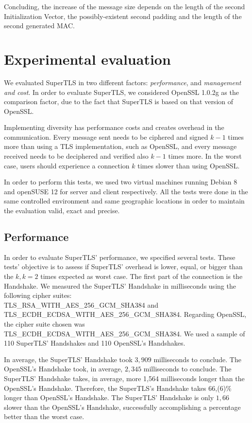 \documentclass{sig-alternate-05-2015}
\begin{document}
Concluding, the increase of the message size depends on the length of the second Initialization Vector, the possibly-existent second padding and the length of the second generated MAC.

\section{Experimental evaluation}

We evaluated SuperTLS in two different factors: \textit{performance}, and \textit{management and cost}.
In order to evaluate SuperTLS, we considered OpenSSL 1.0.2g as the comparison factor, due to the fact that SuperTLS is based on that version of OpenSSL.

Implementing diversity has performance costs and creates overhead in the communication. Every message sent needs to be ciphered and signed $k - 1$ times more than using a TLS implementation, such as OpenSSL, and every message received needs to be deciphered and verified also $k - 1$ times more. In the worst case, users should experience a connection $k$ times slower than using OpenSSL.

In order to perform this tests, we used two virtual machines running Debian 8 and openSUSE 12 for server and client respectively. All the tests were done in the same controlled environment and same geographic locations in order to maintain the evaluation valid, exact and precise.

\subsection{Performance}

In order to evaluate SuperTLS' performance, we specified several tests. These tests' objective is to assess if SuperTLS' overhead is lower, equal, or bigger than the $k, k = 2$ times expected as worst case.
The first part of the connection is the Handshake. We measured the SuperTLS' Handshake in milliseconds using the following cipher suites:\\
TLS\_RSA\_WITH\_AES\_256\_GCM\_SHA384 and\\
TLS\_ECDH\_ECDSA\_WITH\_AES\_256\_GCM\_SHA384. Regarding OpenSSL, the cipher suite chosen was\\TLS\_ECDH\_ECDSA\_WITH\_AES\_256\_GCM\_SHA384. We used a sample of 110 SuperTLS' Handshakes and 110 OpenSSL's Handshakes.

In average, the SuperTLS' Handshake took $3,909$ milliseconds to conclude. The OpenSSL's Handshake took, in average, $2,345$ milliseconds to conclude. The SuperTLS' Handshake takes, in average, more 1,564 milliseconds longer than the OpenSSL's Handshake. Therefore, the SuperTLS's Handshake takes 66,(6)\% longer than OpenSSL's Handshake. The SuperTLS' Handshake is only $1,66$ slower than the OpenSSL's Handshake, successfully accomplishing a percentage better than the worst case.
\end{document}
